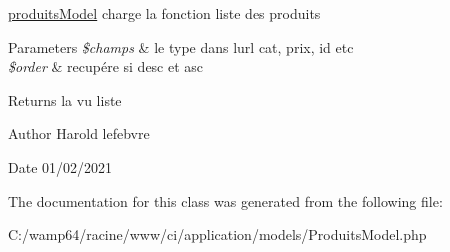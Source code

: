 \mbox{\hyperlink{classproduits_model}{produits\+Model}} charge la fonction liste des produits 


\begin{DoxyParams}{Parameters}
{\em \$champs} & le type dans l\textquotesingle{}url cat, prix, id etc \\
\hline
{\em \$order} & recupére si desc et asc \\
\hline
\end{DoxyParams}
\begin{DoxyReturn}{Returns}
la vu liste 
\end{DoxyReturn}
\begin{DoxyAuthor}{Author}
Harold lefebvre 
\end{DoxyAuthor}
\begin{DoxyDate}{Date}
01/02/2021 
\end{DoxyDate}


The documentation for this class was generated from the following file\+:\begin{DoxyCompactItemize}
\item 
C\+:/wamp64/racine/www/ci/application/models/Produits\+Model.\+php\end{DoxyCompactItemize}
